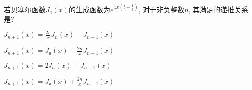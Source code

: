 \documentclass{njustexam}
\begin{document}

  











\begin{problem}
  若贝塞尔函数$J_n(x)$的生成函数为$e^{\frac{1}{2} x (t - \frac{1}{t})}$, 对于非负整数$n$, 其满足的递推关系是?
  \begin{abcd}
    \item  $J_{n+1}(x) = \frac{2n}{x} J_n(x) - J_{n-1}(x)$
    \item  $J_{n+1}(x) = J_n(x) - \frac{2n}{x} J_{n-1}(x)$
    \item  $J_{n+1}(x) = 2 J_n(x) - J_{n-1}(x)$
    \item  $J_{n+1}(x) = J_n(x) + \frac{2n}{x} J_{n-1}(x)$
  \end{abcd}
\end{problem}
\end{document}

